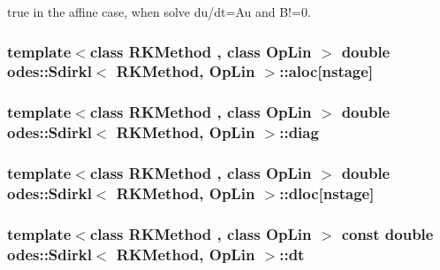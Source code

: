 true in the affine case, when solve du/dt=Au and B!=0. 

\hypertarget{classodes_1_1Sdirkl_a4e76e33316d69a2291706b9b658b1485}{
\subsubsection[{aloc}]{\setlength{\rightskip}{0pt plus 5cm}template$<$class R\-K\-Method , class Op\-Lin $>$ double {\bf odes\-::\-Sdirkl}$<$ R\-K\-Method, Op\-Lin $>$\-::aloc\mbox{[}{\bf nstage}\mbox{]}\hspace{0.3cm}{\ttfamily [private]}}}\label{classodes_1_1Sdirkl_a4e76e33316d69a2291706b9b658b1485}
\hypertarget{classodes_1_1Sdirkl_a0c19422d37c1bf1d40f41c14892befa8}{
\subsubsection[{diag}]{\setlength{\rightskip}{0pt plus 5cm}template$<$class R\-K\-Method , class Op\-Lin $>$ double {\bf odes\-::\-Sdirkl}$<$ R\-K\-Method, Op\-Lin $>$\-::diag\hspace{0.3cm}{\ttfamily [private]}}}\label{classodes_1_1Sdirkl_a0c19422d37c1bf1d40f41c14892befa8}
\hypertarget{classodes_1_1Sdirkl_a61a9061512e260099a88f0531377a531}{
\subsubsection[{dloc}]{\setlength{\rightskip}{0pt plus 5cm}template$<$class R\-K\-Method , class Op\-Lin $>$ double {\bf odes\-::\-Sdirkl}$<$ R\-K\-Method, Op\-Lin $>$\-::dloc\mbox{[}{\bf nstage}\mbox{]}\hspace{0.3cm}{\ttfamily [private]}}}\label{classodes_1_1Sdirkl_a61a9061512e260099a88f0531377a531}
\hypertarget{classodes_1_1Sdirkl_a88089e61856ee563fb7d0797e86b2050}{
\subsubsection[{dt}]{\setlength{\rightskip}{0pt plus 5cm}template$<$class R\-K\-Method , class Op\-Lin $>$ const double {\bf odes\-::\-Sdirkl}$<$ R\-K\-Method, Op\-Lin $>$\-::dt\hspace{0.3cm}{\ttfamily [private]}}}\label{classodes_1_1Sdirkl_a88089e61856ee563fb7d0797e86b2050}


